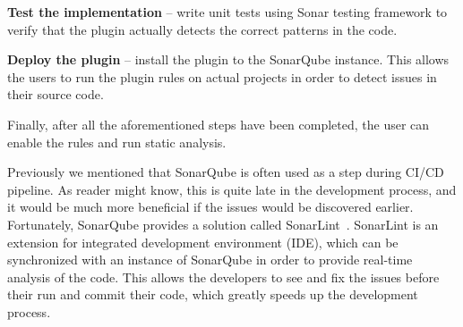 \begin{flushleft}
    \textbf{Test the implementation} -- write unit tests using Sonar testing framework to verify that the
    plugin actually detects the correct patterns in the code.
\end{flushleft}

\begin{flushleft}
    \textbf{Deploy the plugin} -- install the plugin to the SonarQube instance.
    This allows the users to run the plugin rules on actual projects in order to detect issues in their source code.
\end{flushleft}

Finally, after all the aforementioned steps have been completed, the user can enable the rules and run static analysis.

Previously we mentioned that SonarQube is often used as a step during CI/CD pipeline.
As reader might know, this is quite late in the development process, and it would be much more beneficial if the issues
would be discovered earlier.
Fortunately, SonarQube provides a solution called SonarLint~\cite{sonarlint}.
SonarLint is an extension for integrated development environment (IDE), which can be synchronized with an instance of SonarQube in order to provide
real-time analysis of the code.
This allows the developers to see and fix the issues before their run and commit their code, which greatly
speeds up the development process.
